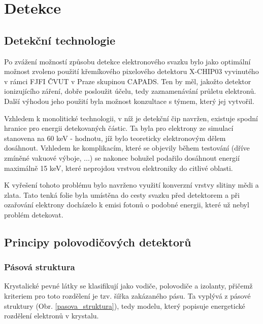 \newcommand{\fig}[3]{ 
	\begin{figure}[!ht]
		\centering
		\texttt{[image: Figure/05/\#2.png]}
		\caption{#3}
		\label{#2}
	\end{figure}
}

\renewcommand{\figurename}{Obr.}
\newcommand{\figref}[1]{\figurename \hspace{1 pt} \ref{#1}}

\newpage \clearpage

\chapter{Detekce}

\section{Detekční technologie}
Po zvážení možností způsobu detekce elektronového svazku bylo jako optimální možnost zvoleno použití křemíkového pixelového detektoru X-CHIP03 vyvinutého v rámci FJFI ČVUT v Praze skupinou CAPADS. Ten by měl, jakožto detektor ionizujícího záření, dobře posloužit účelu, tedy zaznamenávání průletu elektronů. Další výhodou jeho použití byla možnost konzultace s týmem, který jej vytvořil. 

Vzhledem k monolitické technologii, v níž je detekční čip navržen, existuje spodní hranice pro energii detekovaných částic. Ta byla pro elektrony ze simulací stanovena na 60 keV - hodnotu, jíž bylo teoreticky elektronovým dělem dosáhnout. Vzhledem ke komplikacím, které se objevily během testování (dříve zmíněné vakuové výboje, ...) se nakonec bohužel podařilo dosáhnout energií maximálně 15 keV, které neprojdou vrstvou elektroniky do citlivé oblasti.

K vyřešení tohoto problému bylo navrženo využití konverzní vrstvy slitiny mědi a zlata. Tato tenká folie byla umístěna do cesty svazku před detektorem a při ozařování elektrony docházelo k emisi fotonů o podobné energii, které už nebyl problém detekovat. 

\section{Principy polovodičových detektorů}
\subsection{Pásová struktura}
Krystalické pevné látky se klasifikují jako vodiče, polovodiče a izolanty, přičemž kriteriem pro toto rozdělení je tzv. šířka zakázaného pásu. Ta vyplývá z pásové struktury (\figref{pasova_struktura}), tedy modelu, který popisuje energetické rozdělení elektronů v krystalu. 

